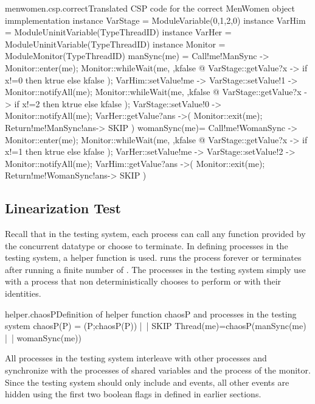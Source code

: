 \documentclass{article}
\begin{document}
\begin{cspfloat}{menwomen.csp.correct}{Translated CSP code for the correct MenWomen object immplementation}
instance VarStage = ModuleVariable({0,1,2},0) 
instance VarHim = ModuleUninitVariable(TypeThreadID)
instance VarHer = ModuleUninitVariable(TypeThreadID)
instance Monitor = ModuleMonitor(TypeThreadID)
manSync(me) = 
  Call!me!ManSync ->
  Monitor::enter(me);
    Monitor::whileWait(me, \ktrue,kfalse @
      VarStage::getValue?x ->
      if x!=0 then ktrue else kfalse
    );
    VarHim::setValue!me ->
    VarStage::setValue!1 ->
    Monitor::notifyAll(me);
    Monitor::whileWait(me, \ktrue,kfalse @
      VarStage::getValue?x ->
      if x!=2 then ktrue else kfalse
    );
    VarStage::setValue!0 ->
    Monitor::notifyAll(me);
    VarHer::getValue?ans ->(
  Monitor::exit(me);
  Return!me!ManSync!ans->
  SKIP
  )
womanSync(me)=
  Call!me!WomanSync ->
  Monitor::enter(me);
    Monitor::whileWait(me, \ktrue,kfalse @
      VarStage::getValue?x ->
      if x!=1 then ktrue else kfalse
    );
    VarHer::setValue!me ->
    VarStage::setValue!2 ->
    Monitor::notifyAll(me);
    VarHim::getValue?ans ->(
  Monitor::exit(me);
  Return!me!WomanSync!ans->
  SKIP
  )
\end{cspfloat}


\subsection{Linearization Test}
Recall that in the testing system, each process can call any function provided by the concurrent datatype or choose to terminate. In defining processes in the testing system, a helper function is used.  runs the process  forever or terminates after running a finite number of . The processes in the testing system simply use  with a process that non deterministically chooses to perform  or  with their identities. 

\begin{cspinline}{helper.chaosP}{Definition of helper function chaosP and processes in the testing system}
chaosP(P) = (P;chaosP(P)) |~| SKIP
Thread(me)=chaosP(manSync(me) |~| womanSync(me))
\end{cspinline}
  
All processes in the testing system interleave with other processes and synchronize with the processes of shared variables and the process of the monitor. Since the testing system should only include  and  events, all other events are hidden using the first two boolean flags in  defined in earlier sections. 
\end{document}

